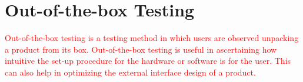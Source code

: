 \chapter{Out-of-the-box Testing}
\textcolor{red}{Out-of-the-box testing is a testing method in which users are observed unpacking a product from its box. Out-of-the-box testing is useful in ascertaining how intuitive the set-up procedure for the hardware or software is for the user. This can also help in optimizing the external interface design of a product.}